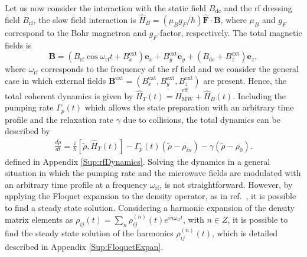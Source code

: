 \documentclass[%
reprint,
 amsmath,amssymb,
 aps,
floatfix,
]{revtex4-1}
\newcommand{\HM}[2][blue]{\textcolor{#1}{ #2}}
\newcommand{\TP}[2][red]{\textcolor{#1}{\textit{TP: #2}}}
\begin{document}
Let us now consider the interaction with the static field $B_\mathrm{dc}$ and the rf dressing field $B_{\mathrm{rf}}$, the slow field interaction is  $\hat{H}_B=(\mu_Bg_F/\hbar)\hat{\mathbf{F}}\cdot\mathbf{B}$, where $\mu_B$ and $g_F$ correspond to the Bohr magnetron and $g_F$-factor, respectively. The total magnetic fields is
\begin{equation}
\mathbf{B}=(B_{\mathrm{rf}} \cos{\omega_{\mathrm{rf}} t} +B_x^{\mathrm{ext}})\mathbf{e}_x+B_y^{\mathrm{ext}}\mathbf{e}_y+(B_{\mathrm{dc}}+B_z^{\mathrm{ext}})\mathbf{e}_z,\label{eq:Blab}
\end{equation}
where $\omega_{\mathrm{rf}}$ corresponds to the frequency of the rf field and we consider the general case in which external fields $\mathbf{B}^{\mathrm{ext}}=(B_x^{\mathrm{ext}},B_y^{\mathrm{ext}},B_z^{\mathrm{ext}})$ are present.
Hence, the total coherent dynamics is given by $\hat{H}_{T}(t)=\hat{H}_{\mathrm{MW}}^{\mathrm{eff}}+\hat{H}_{B}(t)$. Including the pumping rate $\Gamma_p(t)$ which allows the state preparation with an arbitrary time profile and the relaxation rate $\gamma$ due to collisions, the total dynamics can be described by  
\begin{align}
\frac{d\tilde{\rho} }{dt}=\frac{i}{\hbar}[\tilde{\rho},\hat{H}_{T}(t)]-\Gamma_p(t)(\tilde{\rho}-\rho_{in}) - \gamma (\tilde{\rho}-\rho_{0}).\label{eq:rhoT_dynamics}
\end{align}
defined in 
Appendix \ref{Sup:rfDynamics}.
Solving the dynamics in a general situation in which the pumping rate and the microwave fields are modulated with an arbitrary time profile at a frequency $\omega_\mathrm{rf}$, is not straightforward. However, by applying the Floquet expansion to the density operator, as in ref.~\cite{Floquet21}, it is possible to find a steady state solution. Considering a harmonic expansion of the density matrix elements as $\rho_{ij}(t)=\sum_n\rho_{ij}^{(n)}(t) e^{in\omega_{\mathrm{rf}} t}$, with $n\in Z$,  it is possible to find the steady state solution of the harmonics  $\rho_{ij}^{(n)}(t)$,  which is detailed described in 
Appendix \ref{Sup:FloquetExpan}.

\end{document}
